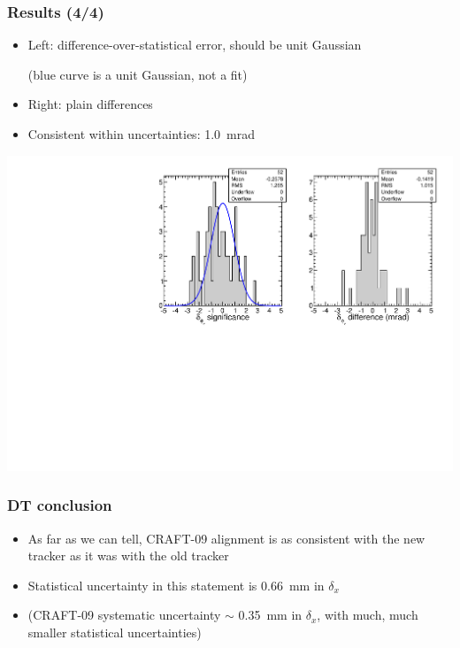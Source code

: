 \documentclass[compress]{beamer}
\begin{document}
\begin{frame}
\frametitle{Results (4/4)}
\begin{itemize}
\item Left: difference-over-statistical error, should be unit Gaussian

(blue curve is a unit Gaussian, not a fit)

\item Right: plain differences

\item Consistent within uncertainties: 1.0~mrad
\end{itemize}

\includegraphics[width=\linewidth]{afterincident_phiz.pdf}
\end{frame}

\begin{frame}
\frametitle{DT conclusion}

\begin{itemize}\setlength{\itemsep}{0.5 cm}
\item As far as we can tell, CRAFT-09 alignment is as consistent with
  the new tracker as it was with the old tracker

\item Statistical uncertainty in this statement is 0.66~mm in $\delta_x$

\item (CRAFT-09 systematic uncertainty $\sim$ 0.35~mm in $\delta_x$,
  with much, much smaller statistical uncertainties)
\end{itemize}
\end{frame}
\end{document}

